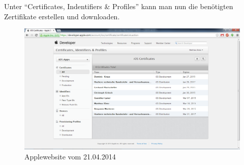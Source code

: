 Unter \enquote{Certificates, Indentifiers \& Profiles} kann man nun die benötigten Zertifikate erstellen und downloaden.\\

\begin{figure}[H]
\includegraphics[keepaspectratio=true, width=14cm]{images/phoneGap/AppleMemberCenter2.png}
\caption{Applewebsite vom 21.04.2014}
\end{figure}

